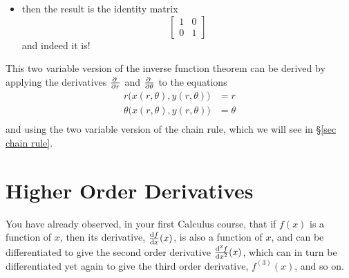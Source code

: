 \begin{eg}
\begin{itemize}
\begin{align*}
\begin{matrix}
      \cos\theta & \sin\theta \\[0.1in]
      -\frac{\sin\theta}{r} & \frac{\cos\theta}{r}
      \end{matrix}\right]\ 
     \left[\begin{matrix}
      \cos\theta & -r\sin\theta \\[0.05in]
      \sin\theta &  r\cos\theta 
      \end{matrix}\right]
\\
&\hskip0.5in=\left[\begin{matrix}
      (\cos\theta)(\cos\theta) + (\sin\theta)(\sin\theta) 
            &(\cos\theta)(-r\sin\theta)+(\sin\theta)(r\cos\theta) 
              \\[0.05in]   
     (-\frac{\sin\theta}{r})(\cos\theta) + (\frac{\cos\theta}{r})(\sin\theta) &    
    (-\frac{\sin\theta}{r})(-r\sin\theta) + (\frac{\cos\theta}{r})(r\cos\theta)
      \end{matrix}\right]
\end{align*}
\item
then the result is the identity matrix
\begin{equation*}
\left[\begin{matrix}
      1 & 0 \\ 
      0 & 1
      \end{matrix}\right]
\end{equation*}
and indeed it is!

\end{itemize}
This two variable version of the inverse function theorem can be derived by applying the derivatives $\pdiff{}{r}$ and $\pdiff{}{\theta}$ to the equations
\begin{align*}
r\big(x(r,\theta),y(r,\theta)\big) &=r \\ 
\theta\big(x(r,\theta),y(r,\theta)\big) &=\theta \\
\end{align*}
and using the two variable version of the chain rule, which we will see in 
\S\ref{sec chain rule}.
\end{eg}

\section{Higher Order Derivatives}\label{sec higher order}

You have already observed, in your first Calculus course,
that if $f(x)$ is a function of $x$, then its derivative, $\diff{f}{x}(x)$,
is also a function of $x$, and can be differentiated to give the
second order derivative $\difftwo{f}{x}(x)$, which can in turn 
be differentiated yet again to give the third order derivative, 
$f^{(3)}(x)$, and so on.

